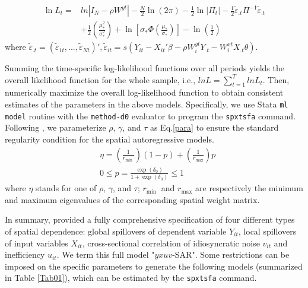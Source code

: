   \begin{equation}\label{gallilik}
	\begin{aligned}
		\ln L_{t}= & ln|I_N - \rho W^{yt}|-\frac{N}{2} \ln (2 \pi)-\frac{1}{2} \ln |\Pi_t|-\frac{1}{2} \tilde{\varepsilon}_{.t} \Pi^{-1} \tilde{\varepsilon}_{.t} \\
		& +\frac{1}{2}\left(\frac{\mu_{*}^{2}}{\sigma_{*}^{2}}\right)+\ln \left[\sigma_{*} \Phi\left(\frac{\mu_{*}}{\sigma_{*}}\right)\right]-\ln \left(\frac{1}{2}\right)
	\end{aligned}
\end{equation}
where $ \tilde{\varepsilon}_{.t} = ( \tilde{\varepsilon}_{1t},..., \tilde{\varepsilon}_{Nt})', \tilde{\varepsilon}_{it}=s(Y_{it}-X_{it}' \beta - \rho W_{i}^{yt}Y_{.t} -W_{i}^{xt}X_{.t} \theta)$. 

Summing the time-specific log-likelihood  functions over all periods yields the overall likelihood function for the whole sample, i.e., $lnL=\sum_{t=1}^TlnL_{t}$. Then, numerically maximize the overall log-likelihood function to obtain consistent estimates of the parameters in the above models.  Specifically, we use Stata {\tt ml model} routine with the {\tt method-d0} evaluator to program the {\tt spxtsfa} command. Following \cite{gude2018heterogeneous}, we parameterize $\rho$, $\gamma$, and $\tau$ as Eq.\eqref{para} to ensure the standard regularity condition for the spatial autoregressive models.
\begin{equation}\label{para}
\begin{aligned}
	& \eta=\left(\frac{1}{r_{\text {min }}}\right)(1-p)+\left(\frac{1}{r_{\max }}\right) p \\
	& 0 \leq p=\frac{\exp \left(\delta_0\right)}{1+\exp \left(\delta_0\right)} \leq 1
\end{aligned}
\end{equation}
where $\eta$ stands for one of $\rho$, $\gamma$, and $\tau$;  $r_{\text {min }}$ and $r_{\text {max}}$ are respectively the minimum and maximum eigenvalues of the corresponding spatial weight matrix. 

In summary, \cite{galli2022spatial} provided a fully comprehensive specification of four different types of spatial dependence: global spillovers of dependent variable $Y_{it}$, local spillovers of input variables $X_{it}$, cross-sectional correlation of idiosyncratic noise  $v_{it}$ and inefficiency $u_{it}$. We term this full model "$yxuv$-SAR". Some restrictions can be imposed on the specific parameters to generate the following  models (summarized in Table \ref{Tab01}), which can be estimated by the {\tt spxtsfa} command.


